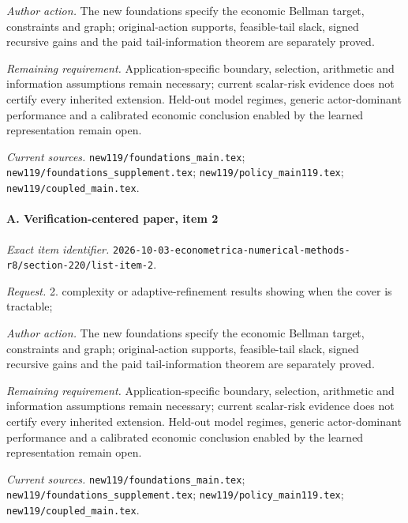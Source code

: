 \par\emph{Author action.} The new foundations specify the economic Bellman target, constraints and graph; original-action supports, feasible-tail slack, signed recursive gains and the paid tail-information theorem are separately proved.

\par\emph{Remaining requirement.} Application-specific boundary, selection, arithmetic and information assumptions remain necessary; current scalar-risk evidence does not certify every inherited extension. Held-out model regimes, generic actor-dominant performance and a calibrated economic conclusion enabled by the learned representation remain open.

\par\emph{Current sources.} \nolinkurl{new119/foundations_main.tex}; \nolinkurl{new119/foundations_supplement.tex}; \nolinkurl{new119/policy_main119.tex}; \nolinkurl{new119/coupled_main.tex}.

\paragraph{A. Verification-centered paper, item 2}

\emph{Exact item identifier.} \nolinkurl{2026-10-03-econometrica-numerical-methods-r8/section-220/list-item-2}.

\par\emph{Request.} 2. complexity or adaptive-refinement results showing when the cover is tractable;

\par\emph{Author action.} The new foundations specify the economic Bellman target, constraints and graph; original-action supports, feasible-tail slack, signed recursive gains and the paid tail-information theorem are separately proved.

\par\emph{Remaining requirement.} Application-specific boundary, selection, arithmetic and information assumptions remain necessary; current scalar-risk evidence does not certify every inherited extension. Held-out model regimes, generic actor-dominant performance and a calibrated economic conclusion enabled by the learned representation remain open.

\par\emph{Current sources.} \nolinkurl{new119/foundations_main.tex}; \nolinkurl{new119/foundations_supplement.tex}; \nolinkurl{new119/policy_main119.tex}; \nolinkurl{new119/coupled_main.tex}.

